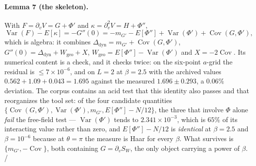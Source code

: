 \paragraph{Lemma 7 (the skeleton).} With $F=\partial_{v}V=G+\Phi'$ and $\kappa=\partial_{v}^{2}V=H+\Phi''$,
\begin{equation}
\operatorname{Var}(F)-E[\kappa]=-G''(0)=-m_{G'}-E[\Phi'']+\operatorname{Var}(\Phi')
+\operatorname{Cov}(G,\Phi'),
\label{eq:h1s-skeleton}
\end{equation}
which is algebra: it combines $\Delta_{\mathrm{dyn}}=m_{G'}+\operatorname{Cov}(G,\Phi')$,
$G''(0)=\Delta_{\mathrm{dyn}}+W_{\mathrm{geo}}+X$, $W_{\mathrm{geo}}=E[\Phi'']-\operatorname{Var}(\Phi')$
and $X=-2\operatorname{Cov}$. Its numerical content is a check, and it checks twice: on the six-point
$a$-grid the residual is $\le7\times10^{-6}$, and on $L=2$ at $\beta=2.5$ with the archived values
$0.562+1.09+0.043=1.695$ against the measured $1.696\pm0.293$, a $0.06\%$ deviation. The corpus
contains an acid test that this identity also passes and that reorganizes the tool set: of the four
candidate quantities $\{\operatorname{Cov}(G,\Phi'),\operatorname{Var}(\Phi'),m_{G'},
E[\Phi'']-N/12\}$, the three that involve $\Phi$ alone \emph{fail} the free-field test ---
$\operatorname{Var}(\Phi')$ tends to $2.341\times10^{-3}$, which is $65\%$ of its interacting value
rather than zero, and $E[\Phi'']-N/12$ is \emph{identical} at $\beta=2.5$ and $\beta=10^{-6}$ because
at $\theta=\pi$ the measure is Haar for every $\beta$. What survives is $\{m_{G'},-\operatorname{Cov}\}$,
both containing $G=\partial_{v}S_{W}$, the only object carrying a power of $\beta$. \LT{}/~\LE


